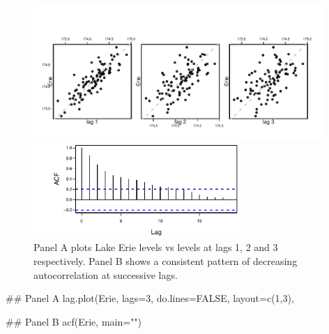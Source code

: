 \documentclass{tufte-book}\usepackage[]{graphicx}\usepackage[]{color}
\begin{document}
\begin{figure}
\begin{Schunk}


\centerline{\includegraphics[width=0.98\textwidth]{figs/12-lagErie-1} }

\end{Schunk}
\vspace*{-3pt}

\begin{Schunk}


\centerline{\includegraphics[width=0.7\textwidth]{figs/12-acfErie-1} }

\end{Schunk}
\caption{Panel A plots Lake Erie levels vs levels at lags 1, 2 and 3
  respectively. Panel B shows a consistent pattern of decreasing
  autocorrelation at successive lags.
}\label{erie-lagplot}
\vspace*{-6pt}
\end{figure}

\begin{marginfigure}[-10cm]
\begin{Schunk}
\begin{Sinput}
## Panel A
lag.plot(Erie, lags=3,
         do.lines=FALSE,
         layout=c(1,3),
\end{Sinput}
\end{Schunk}
\begin{Schunk}
\begin{Sinput}
## Panel B
acf(Erie, main="")
\end{Sinput}
\end{Schunk}
\end{marginfigure}
\end{document}
